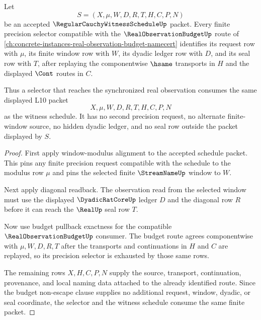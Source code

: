 \begin{theorem}
\label{thm:regular-cauchy-witness-schedule-budget-selector-compatibility}
Let
$$
S=(X,\mu,W,D,R,T,H,C,P,N)
$$
be an accepted $\RegularCauchyWitnessScheduleUp$ packet. Every finite precision selector compatible with the $\RealObservationBudgetUp$ route of \autoref{ch:concrete-instances-real-observation-budget-namecert} identifies its request row with $\mu$, its finite window row with $W$, its dyadic ledger row with $D$, and its seal row with $T$, after replaying the componentwise $\hsame$ transports in $H$ and the displayed $\Cont$ routes in $C$.

Thus a selector that reaches the synchronized real observation consumes the same displayed L10 packet
$$
X,\mu,W,D,R,T,H,C,P,N
$$
as the witness schedule. It has no second precision request, no alternate finite-window source, no hidden dyadic ledger, and no seal row outside the packet displayed by $S$.
\end{theorem}
\begin{proof}
First apply window-modulus alignment to the accepted schedule packet. This pins any finite precision request compatible with the schedule to the modulus row $\mu$ and pins the selected finite $\StreamNameUp$ window to $W$.

Next apply diagonal readback. The observation read from the selected window must use the displayed $\DyadicRatCoreUp$ ledger $D$ and the diagonal row $R$ before it can reach the $\RealUp$ seal row $T$.

Now use budget pullback exactness for the compatible $\RealObservationBudgetUp$ consumer. The budget route agrees componentwise with $\mu,W,D,R,T$ after the transports and continuations in $H$ and $C$ are replayed, so its precision selector is exhausted by those same rows.

The remaining rows $X,H,C,P,N$ supply the source, transport, continuation, provenance, and local naming data attached to the already identified route. Since the budget non-escape clause supplies no additional request, window, dyadic, or seal coordinate, the selector and the witness schedule consume the same finite packet.
\end{proof}

